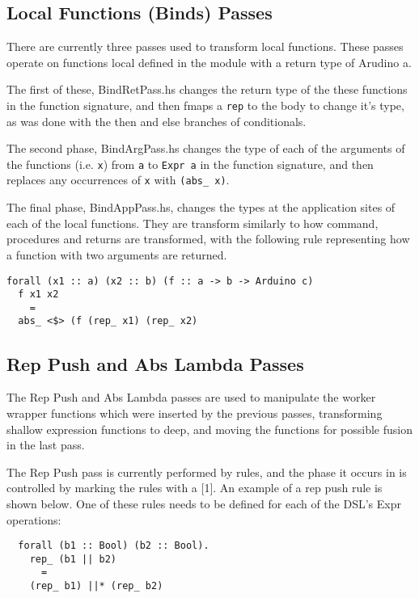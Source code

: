 \documentclass[11pt, oneside]{article}   	%
\begin{document}
\subsection{Local Functions (Binds) Passes}

There are currently three passes used to transform local functions.  These
passes operate on functions local defined in the module with a return type
of Arudino a.

The first of these, BindRetPass.hs changes the return type of the these
functions in the function signature, and then fmaps a \verb+rep+ to the body to 
change it's type, as was done with the then and else branches of 
conditionals.

The second phase, BindArgPass.hs changes the type of each of the
arguments of the functions (i.e.  \verb+x+) from \verb+a+ to  \verb+Expr a+
in the function signature, and then replaces any occurrences of  \verb+x+ 
with \verb+(abs_ x)+.

The final phase, BindAppPass.hs, changes the types at the application
sites of each of the local functions.  They are transform similarly to
how command, procedures and returns are transformed, with the
following rule representing how a function with two arguments are
returned.

\begin{verbatim}
forall (x1 :: a) (x2 :: b) (f :: a -> b -> Arduino c)
  f x1 x2  
    =  
  abs_ <$> (f (rep_ x1) (rep_ x2)
\end{verbatim}

\subsection{Rep Push and Abs Lambda Passes}

The Rep Push and Abs Lambda passes are used to manipulate the worker
wrapper functions which were inserted by the previous passes, transforming
shallow expression functions to deep, and moving the functions for
possible fusion in the last pass.

The Rep Push pass is currently performed by rules, and the phase it occurs in
is controlled by marking the rules with a [1].  An example of a rep push rule
is shown below.  One of these rules needs to be defined for each of the DSL's
Expr operations:

\begin{verbatim}
  forall (b1 :: Bool) (b2 :: Bool).
    rep_ (b1 || b2)
      =
    (rep_ b1) ||* (rep_ b2)
\end{verbatim}
\end{document}
